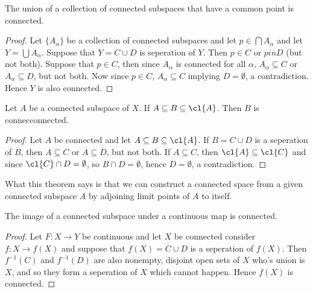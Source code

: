 \begin{theorem}\label{3.1.4}
    The union of a collection of connected subspaces that have a common point is connected.
\end{theorem}
\begin{proof}
    Let $\{A_{\alpha}\}$ be a collection of connected subspaces and let $p \in \bigcap{A_{\alpha}}$
    and let $Y=\bigcup{A_{\alpha}}$. Suppose that $Y=C \cup D$ is seperation of  $Y$. Then  $p \in
    C$ or  $p in D$  (but not both). Suppose that $p \in C$, then since $A_{\alpha}$ is connected
    for all $\alpha$,  $A_{\alpha} \subseteq C$ or $A_{\alpha} \subseteq D$, but not both. Now since
    $p \in C$,  $A_{\alpha} \subseteq C$ implying $D=\emptyset$, a contradiction. Hence  $Y$ is also
    connected.
\end{proof}

\begin{theorem}\label{3.1.5}
    Let $A$ be a connected subspace of  $X$. If  $A \subseteq B \subseteq \cl{A}$. Then $B$ is
    connecconnected.
\end{theorem}
\begin{proof}
    Let $A$ be connected and let  $A \subseteq B \subseteq \cl{A}$. If $B=C \cup D$ is a seperation
    of  $B$, then  $A \subseteq C$ or  $A \subseteq D$, but not both. If  $A \subseteq C$, then
    $\cl{A} \subseteq \cl{C}$ and since $\cl{C} \cap D=\emptyset$, so $B \cap D=\emptyset$, hence
    $D=\emptyset$, a contradiction.
\end{proof}
\begin{remark}
    What this theorem says is that we can construct a connected space from a given connected
    subspace $A$ by adjoining limit points of $A$ to itself.
\end{remark}

\begin{theorem}\label{3.1.6}
    The image of a connected subspace under a continuous map is connected.
\end{theorem}
\begin{proof}
    Let $F:X \rightarrow Y$ be continuous and let $X$ be connected consider  
    $f:X \rightarrow f(X)$ and suppose that $f(X)=C \cup D$ is a seperation of $f(X)$. Then
    $f^{-1}(C)$ and $f^{-1}(D)$ are also nonempty, disjoint open sets of $X$ who's union is  $X$,
    and so they form a seperation of  $X$ which cannot happen. Hence  $f(X)$ is connected.
\end{proof}


